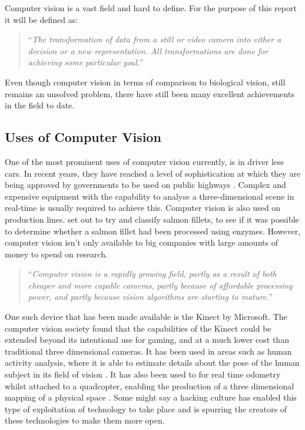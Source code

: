 \documentclass[11pt,oneside]{report}
\begin{document}
				
				Computer vision is a vast field and hard to define.
				For the purpose of this report it will be defined as:
	
				\begin{quote}
					``\textit{The transformation of data from a still or video camera into either a decision or a new representation.
						All transformations are done for achieving some particular goal.}'' \cite[p. 2]{definition:cv}
				\end{quote}
				
				Even though computer vision in terms of comparison to biological vision, still remains an unsolved problem, there have still been many excellent achievements in the field to date.
			\subsection{Uses of Computer Vision}
				One of the most prominent uses of computer vision currently, is in driver less cars.
				In recent years, they have reached a level of sophistication at which they are being approved by governments to be used on public highways \cite{web:driverlessCars}.
				Complex and expensive equipment with the capability to analyse a three-dimensional scene in real-time is usually required to achieve this.
				Computer vision is also used on production lines.
				 set out to try and classify salmon fillets, to see if it was possible to determine whether a salmon fillet had been processed using enzymes. %
				However, computer vision isn't only available to big companies with large amounts of money to spend on research.
				\begin{quote}
				``\textit{Computer vision is a rapidly growing field, partly as a result of both cheaper and more capable cameras, partly because of affordable processing power, and partly because vision algorithms are starting to mature.}''\cite[p. ix]{definition:cv}
				\end{quote}
				One such device that has been made available is the Kinect by Microsoft.
				The computer vision society found that the capabilities of the Kinect could be extended beyond its intentional use for gaming, and at a much lower cost than traditional three dimensional cameras.
				It has been used in areas such as human activity analysis, where it is able to estimate details about the pose of the human subject in its field of vision \cite{kinect:1}.
				It has also been used to for real time odometry whilst attached to a quadcopter, enabling the production of a three dimensional mapping of a physical space \cite{kinect:2}.
				Some might say a hacking culture has enabled this type of exploitation of technology to take place and is spurring the creators of these technologies to make them more open.
				
\end{document}
